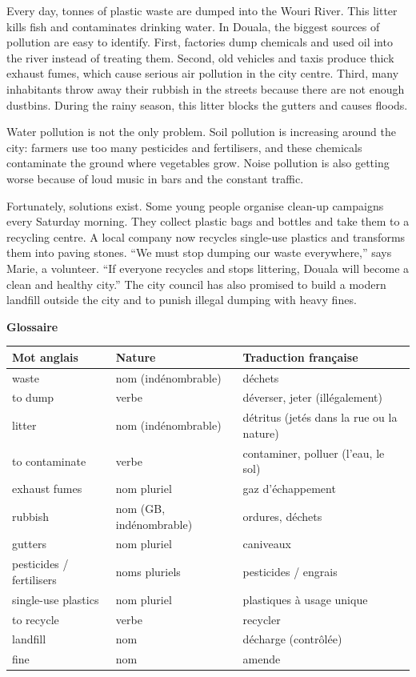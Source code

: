 \documentclass[11pt]{article}
\begin{document}
\begin{textebox}
Every day, tonnes of plastic waste are dumped into the Wouri River. This litter kills fish and contaminates drinking water. In Douala, the biggest sources of pollution are easy to identify. First, factories dump chemicals and used oil into the river instead of treating them. Second, old vehicles and taxis produce thick exhaust fumes, which cause serious air pollution in the city centre. Third, many inhabitants throw away their rubbish in the streets because there are not enough dustbins. During the rainy season, this litter blocks the gutters and causes floods.

Water pollution is not the only problem. Soil pollution is increasing around the city: farmers use too many pesticides and fertilisers, and these chemicals contaminate the ground where vegetables grow. Noise pollution is also getting worse because of loud music in bars and the constant traffic.

Fortunately, solutions exist. Some young people organise clean-up campaigns every Saturday morning. They collect plastic bags and bottles and take them to a recycling centre. A local company now recycles single-use plastics and transforms them into paving stones. “We must stop dumping our waste everywhere,” says Marie, a volunteer. “If everyone recycles and stops littering, Douala will become a clean and healthy city.” The city council has also promised to build a modern landfill outside the city and to punish illegal dumping with heavy fines.
\end{textebox}

\textbf{Glossaire}

\begin{center}
\begin{tabularx}{\linewidth}{|l|l|X|}
\hline
\rowcolor{popblueL} \textbf{Mot anglais} & \textbf{Nature} & \textbf{Traduction française} \\
\hline
waste & nom (indénombrable) & déchets \\
\hline
to dump & verbe & déverser, jeter (illégalement) \\
\hline
litter & nom (indénombrable) & détritus (jetés dans la rue ou la nature) \\
\hline
to contaminate & verbe & contaminer, polluer (l'eau, le sol) \\
\hline
exhaust fumes & nom pluriel & gaz d'échappement \\
\hline
rubbish & nom (GB, indénombrable) & ordures, déchets \\
\hline
gutters & nom pluriel & caniveaux \\
\hline
pesticides / fertilisers & noms pluriels & pesticides / engrais \\
\hline
single-use plastics & nom pluriel & plastiques à usage unique \\
\hline
to recycle & verbe & recycler \\
\hline
landfill & nom & décharge (contrôlée) \\
\hline
fine & nom & amende \\
\hline
\end{tabularx}
\end{center}
\end{document}
